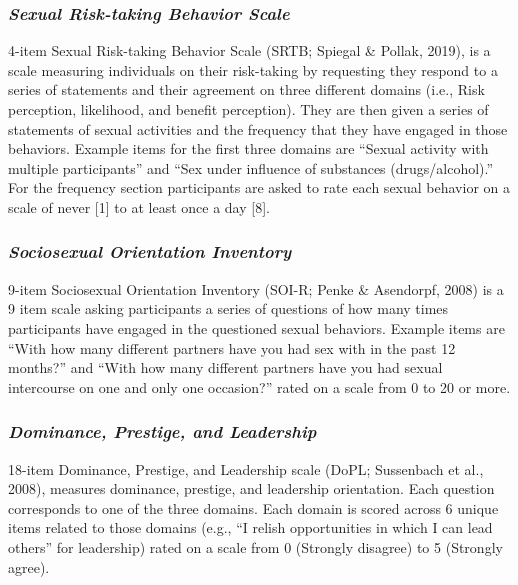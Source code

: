\documentclass[
  donotrepeattitle,doc, 12pt, a4paper,floatsintext]{apa7}
\begin{document}
\hypertarget{sexual-risk-taking-behavior-scale}{%
\subsubsection{\texorpdfstring{\emph{Sexual Risk-taking Behavior Scale}}{Sexual Risk-taking Behavior Scale}}\label{sexual-risk-taking-behavior-scale}}

4-item Sexual Risk-taking Behavior Scale (SRTB; Spiegal \& Pollak, 2019), is a scale measuring individuals on their risk-taking by requesting they respond to a series of statements and their agreement on three different domains (i.e., Risk perception, likelihood, and benefit perception). They are then given a series of statements of sexual activities and the frequency that they have engaged in those behaviors. Example items for the first three domains are ``Sexual activity with multiple participants'' and ``Sex under influence of substances (drugs/alcohol).'' For the frequency section participants are asked to rate each sexual behavior on a scale of never {[}1{]} to at least once a day {[}8{]}.

\hypertarget{sociosexual-orientation-inventory}{%
\subsubsection{\texorpdfstring{\emph{Sociosexual Orientation Inventory}}{Sociosexual Orientation Inventory}}\label{sociosexual-orientation-inventory}}

9-item Sociosexual Orientation Inventory (SOI-R; Penke \& Asendorpf, 2008) is a 9 item scale asking participants a series of questions of how many times participants have engaged in the questioned sexual behaviors. Example items are ``With how many different partners have you had sex with in the past 12 months?'' and ``With how many different partners have you had sexual intercourse on one and only one occasion?'' rated on a scale from 0 to 20 or more.

\hypertarget{dominance-prestige-and-leadership}{%
\subsubsection{\texorpdfstring{\emph{Dominance, Prestige, and Leadership}}{Dominance, Prestige, and Leadership}}\label{dominance-prestige-and-leadership}}

18-item Dominance, Prestige, and Leadership scale (DoPL; Sussenbach et al., 2008), measures dominance, prestige, and leadership orientation. Each question corresponds to one of the three domains. Each domain is scored across 6 unique items related to those domains (e.g., ``I relish opportunities in which I can lead others'' for leadership) rated on a scale from 0 (Strongly disagree) to 5 (Strongly agree).
\end{document}
